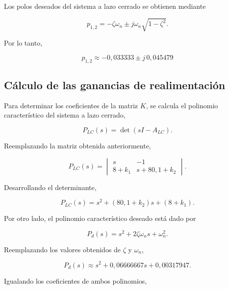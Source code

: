 \documentclass[10pt]{article}
\begin{document}
Los polos deseados del sistema a lazo cerrado se
obtienen mediante

\begin{equation}
    p_{1,2}=
    -\zeta\omega_n
    \pm j\omega_n\sqrt{1-\zeta^2}.
\end{equation}

Por lo tanto,

\begin{equation}
    \boxed{
        p_{1,2}\approx
        -0{,}033333\pm j\,0{,}045479
    }
    \label{eq:ej8_polos}
\end{equation}


\subsection{Cálculo de las ganancias de realimentación}

Para determinar los coeficientes de la matriz $K$,
se calcula el polinomio característico del sistema
a lazo cerrado,

\begin{equation}
    P_{LC}(s)=\det(sI-A_{LC}).
\end{equation}

Reemplazando la matriz obtenida anteriormente,

\begin{equation}
    P_{LC}(s)=
    \begin{vmatrix}
        s & -1\\
        8+k_1 & s+80{,}1+k_2
    \end{vmatrix}.
\end{equation}

Desarrollando el determinante,

\begin{equation}
    P_{LC}(s)=
    s^2+(80{,}1+k_2)s+(8+k_1).
\end{equation}

Por otro lado, el polinomio característico deseado
está dado por

\begin{equation}
    P_d(s)=
    s^2+2\zeta\omega_ns+\omega_n^2.
\end{equation}

Reemplazando los valores obtenidos de $\zeta$ y
$\omega_n$,

\begin{equation}
    P_d(s)\approx
    s^2+0{,}06666667s+0{,}00317947.
\end{equation}

Igualando los coeficientes de ambos polinomios,
\end{document}
